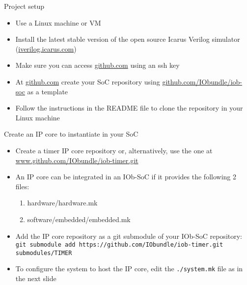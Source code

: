 \documentclass [xcolor=svgnames, t] {beamer}
\begin{document}
\begin{frame}{Project setup}
\begin{center}
  \begin{itemize}
    \item Use a Linux machine or VM
    \item Install the latest stable version of the open source Icarus Verilog simulator (\url{iverilog.icarus.com})
    \item Make sure you can access \url{github.com} using an ssh key
    \item At \url{github.com} create your SoC repository using \url{github.com/IObundle/iob-soc} as a template
    \item Follow the instructions in the README file to clone the repository in your Linux machine
  \end{itemize}
\end{center}
\end{frame}


\begin{frame}{Create an IP core to instantiate in your SoC}
  \begin{itemize}
  \item Create a timer IP core repository or, alternatively, use the one at \url{www.github.com/IObundle/iob-timer.git}
  \item An IP core can be integrated in an IOb-SoC if it provides the following 2 files: 
    \begin{enumerate}
    \item hardware/hardware.mk
    \item software/embedded/embedded.mk
    \end{enumerate}
  \item Add the IP core repository as a git submodule of your IOb-SoC repository:\\
    {\small \tt git submodule add https://github.com/IObundle/iob-timer.git submodules/TIMER}
  \item To configure the system to host the IP core, edit the {\tt ./system.mk} file as in the next slide
  \end{itemize}
\end{frame}

\lstset{basicstyle=\ttfamily,columns=fullflexible}
\end{document}
